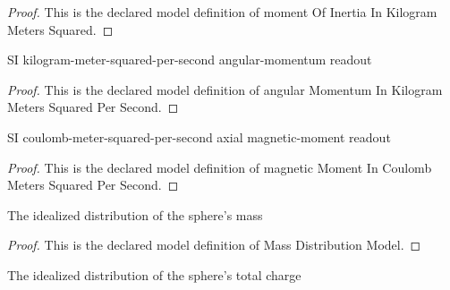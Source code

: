 \begin{proof}
  This is the declared model definition of moment Of Inertia In Kilogram Meters Squared.
\end{proof}
\begin{definition}
  \label{def:physics:phyx-mini-0563:phyxminiproblems-problemphyxmini0563-angularmomentuminkilogrammeterssquaredpersecond}
  SI kilogram-meter-squared-per-second angular-momentum readout
\end{definition}
\begin{proof}
  This is the declared model definition of angular Momentum In Kilogram Meters Squared Per Second.
\end{proof}
\begin{definition}
  \label{def:physics:phyx-mini-0563:phyxminiproblems-problemphyxmini0563-magneticmomentincoulombmeterssquaredpersecond}
  SI coulomb-meter-squared-per-second axial magnetic-moment readout
\end{definition}
\begin{proof}
  This is the declared model definition of magnetic Moment In Coulomb Meters Squared Per Second.
\end{proof}
\begin{definition}
  \label{def:physics:phyx-mini-0563:phyxminiproblems-problemphyxmini0563-massdistributionmodel}
  The idealized distribution of the sphere's mass
\end{definition}
\begin{proof}
  This is the declared model definition of Mass Distribution Model.
\end{proof}
\begin{definition}
  \label{def:physics:phyx-mini-0563:phyxminiproblems-problemphyxmini0563-chargedistributionmodel}
  The idealized distribution of the sphere's total charge
\end{definition}
